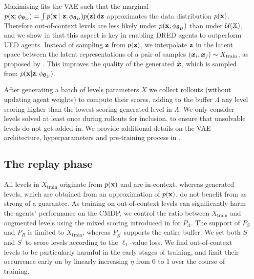 \documentclass{article}
\theoremstyle{plain}
\theoremstyle{definition}
\theoremstyle{remark}
\begin{document}
Maximising  fits the VAE such that the marginal $p(\rvx; \phi_{\vtheta_D}) = \int p(\rvx \mid \rvz; \phi_{\vtheta_D}) p(\rvz) \dif \rvz$ approximates the data distribution $p({\mathbf{x}})$. Therefore out-of-context levels are less likely under $p({\mathbf{x}}; \phi_{{\bm{\theta}}_D})$ than under $\mathcal{U}({\mathbb{X}})$, and we show in  that this aspect is key in enabling DRED agents to outperform UED agents. %
Instead of sampling ${\mathbf{z}}$ from $p({\mathbf{z}})$, we interpolate ${\mathbf{z}}$ in the latent space between the latent representations of a pair of samples $({\bm{x}}_i, {\bm{x}}_j) \sim X_\text{train}$, as proposed by \citet{white2016sampling}. This improves the quality of the generated $\tilde{{\bm{x}}}$, which is sampled from $p({\mathbf{x}} | {\mathbf{z}}; \phi_{{\bm{\theta}}_D})$. 

After generating a batch of levels parameters $\tilde{X}$ we collect rollouts (without updating agent weights) to compute their scores, adding to the buffer $\Lambda$ any level scoring higher than the lowest scoring generated level in $\Lambda$. We only consider levels solved at least once during rollouts for inclusion, to ensure that unsolvable levels do not get added in. We provide additional details on the VAE architecture, hyperparameters and pre-training process in .

\subsection{The replay phase}
All levels in $X_\text{train}$ originate from $p({\mathbf{x}})$ and are in-context, whereas generated levels, which are obtained from an approximation of $p({\mathbf{x}})$, do not benefit from as strong of a guarantee. As training on out-of-context levels can significantly harm the agents' performance on the CMDP, we control the ratio between $X_\text{train}$ and augmented levels using the mixed scoring introduced in  for $P_\Lambda$. The support of $P_S$ and $P_R$ is limited to $X_\text{train}$, whereas $P_{S^\prime}$ supports the entire buffer. We set both $S$ and $S^\prime$ to score levels according to the $\ell_1$-value loss. We find out-of-context levels to be particularly harmful in the early stages of training, and limit their occurrence early on by linearly increasing $\eta$ from 0 to 1 over the course of training.
\end{document}
